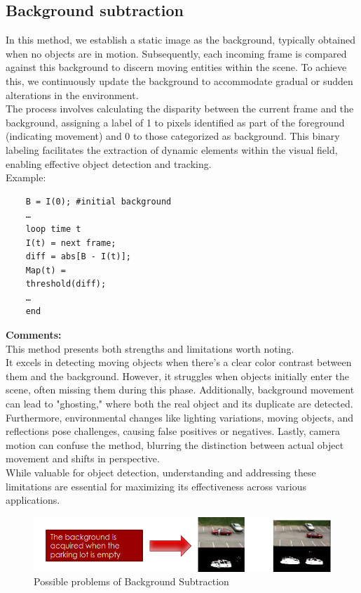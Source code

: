 \subsection{Background subtraction}
In this method, we establish a static image as the background, typically obtained when no objects are in motion. 
Subsequently, each incoming frame is compared against this background to discern moving entities within the scene. 
To achieve this, we continuously update the background to accommodate gradual or sudden alterations in the environment.
\\
The process involves calculating the disparity between the current frame and the background, assigning a label of 1 to pixels identified as part of the foreground (indicating movement) and 0 to those categorized as background. 
This binary labeling facilitates the extraction of dynamic elements within the visual field, enabling effective object detection and tracking.
\\Example: 
\begin{verbatim}
    B = I(0); #initial background
    …
    loop time t
    I(t) = next frame;
    diff = abs[B - I(t)];
    Map(t) =
    threshold(diff);
    …
    end
\end{verbatim} 
\textbf{Comments:}
\\
This method presents both strengths and limitations worth noting.
\\
It excels in detecting moving objects when there's a clear color contrast between them and the background. 
However, it struggles when objects initially enter the scene, often missing them during this phase. 
Additionally, background movement can lead to "ghosting," where both the real object and its duplicate are detected.
\\
Furthermore, environmental changes like lighting variations, moving objects, and reflections pose challenges, causing false positives or negatives. 
        Lastly, camera motion can confuse the method, blurring the distinction between actual object movement and shifts in perspective.
\\
While valuable for object detection, understanding and addressing these limitations are essential for maximizing its effectiveness across various applications.
\begin{figure}[h]
    \centering
    \includegraphics[scale=0.4]{Figures/BackgroundSub.png}
    \caption{Possible problems of Background Subtraction}
\end{figure}
